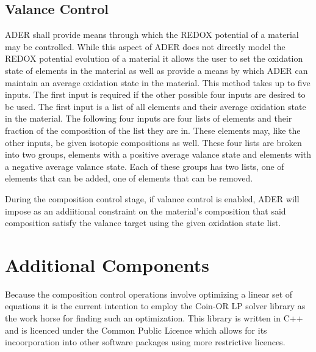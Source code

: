 \documentclass[12pt]{article}
\begin{document}
\subsection{Valance Control}
ADER shall provide means through which the REDOX potential of a material may
be controlled. While this aspect of ADER does not directly model the REDOX
potential evolution of a material it allows the user to set the oxidation
state of elements in the material as well as provide a means by which ADER
can maintain an average oxidation state in the material. This method takes up
to five inputs. The first input is required if the other possible
 four inputs are
desired to be used. The first input is a list of all elements and their
average oxidation state in the material.
 The following four inputs are four lists
of elements and their fraction of the composition of the list they are in.
These elements may, like the other inputs, be given isotopic compositions as
well.
These four lists are broken into two groups, elements with a positive average
valance state and elements with a negative average valance state. Each of these
groups has two lists, one of elements that can be added, one of elements that
can be removed. \par
During the composition control stage, if valance control is enabled,
ADER will impose as an addiitional constraint on the material's composition
that said composition satisfy the valance target using the given oxidation
state list.
\section{Additional Components}
Because the composition control operations involve optimizing a linear set
of equations it is the current intention to employ the Coin-OR LP solver
library as the work horse for finding such an optimization. This library
is written in C++ and is licenced under the Common Public Licence which
allows for its incoorporation into other software packages using
more restrictive licences. 
\end{document}
